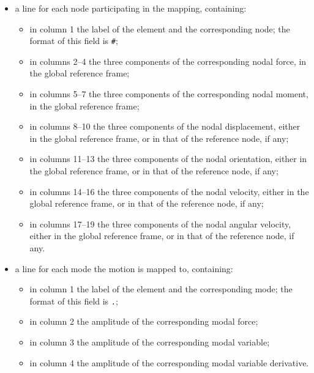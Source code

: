 \begin{itemize}
\item a line for each node participating in the mapping, containing:
\begin{itemize}
\item in column 1 the label of the element and the corresponding node;
	the format of this field is \texttt{\#};
\item in columns 2--4 the three components of the corresponding nodal force,
	in the global reference frame;
\item in columns 5--7 the three components of the corresponding nodal moment,
	in the global reference frame;
\item in columns 8--10 the three components of the nodal displacement,
	either in the global reference frame, or in that of the reference node,
	if any;
\item in columns 11--13 the three components of the nodal orientation,
	either in the global reference frame, or in that of the reference node,
	if any;
\item in columns 14--16 the three components of the nodal velocity,
	either in the global reference frame, or in that of the reference node,
	if any;
\item in columns 17--19 the three components of the nodal angular velocity,
	either in the global reference frame, or in that of the reference node,
	if any.
\end{itemize}

\item a line for each mode the motion is mapped to, containing:
\begin{itemize}
\item in column 1 the label of the element and the corresponding mode;
	the format of this field is \texttt{.};
\item in column 2 the amplitude of the corresponding modal force;
\item in column 3 the amplitude of the corresponding modal variable;
\item in column 4 the amplitude of the corresponding modal variable derivative.
\end{itemize}
\end{itemize}





